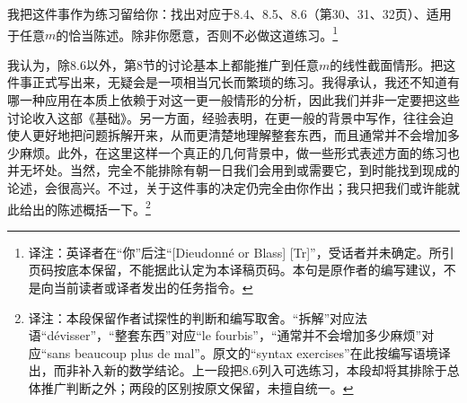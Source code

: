 \documentclass[openany,fontset=fandol]{ctexbook}
\newcommand{\note}[1]{\footnote{译注：#1}}
\begin{document}
我把这件事作为练习留给你：找出对应于8.4、8.5、8.6（第30、31、32页）、适用于任意$m$的恰当陈述。除非你愿意，否则不必做这道练习。\note{英译者在“你”后注“[Dieudonn\'e or Blass] [Tr]”，受话者并未确定。所引页码按底本保留，不能据此认定为本译稿页码。本句是原作者的编写建议，不是向当前读者或译者发出的任务指令。}

我认为，除8.6以外，第8节的讨论基本上都能推广到任意$m$的线性截面情形。把这件事正式写出来，无疑会是一项相当冗长而繁琐的练习。我得承认，我还不知道有哪一种应用在本质上依赖于对这一更一般情形的分析，因此我们并非一定要把这些讨论收入这部《基础》。另一方面，经验表明，在更一般的背景中写作，往往会迫使人更好地把问题拆解开来，从而更清楚地理解整套东西，而且通常并不会增加多少麻烦。此外，在这里这样一个真正的几何背景中，做一些形式表述方面的练习也并无坏处。当然，完全不能排除有朝一日我们会用到或需要它，到时能找到现成的论述，会很高兴。不过，关于这件事的决定仍完全由你作出；我只把我们或许能就此给出的陈述概括一下。\note{本段保留作者试探性的判断和编写取舍。“拆解”对应法语“d\'evisser”，“整套东西”对应“le fourbis”，“通常并不会增加多少麻烦”对应“sans beaucoup plus de mal”。原文的“syntax exercises”在此按编写语境译出，而非补入新的数学结论。上一段把8.6列入可选练习，本段却将其排除于总体推广判断之外；两段的区别按原文保留，未擅自统一。}
\end{document}
